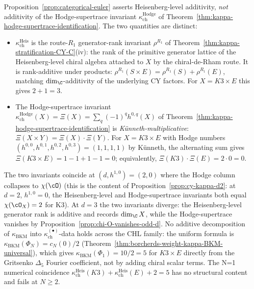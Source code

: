 \begin{remark}
\label{rem:categorical-euler-scope}
Proposition~\ref{prop:categorical-euler} asserts Heisenberg-level additivity, \emph{not} additivity of the Hodge-supertrace invariant $\kappa_{\mathrm{ch}}^{\mathrm{Hodge}}$ of Theorem~\ref{thm:kappa-hodge-supertrace-identification}. The two quantities are distinct:
\begin{itemize}
 \item $\kappa_{\mathrm{ch}}^{\mathrm{Heis}}$ is the route-$R_1$ generator-rank invariant $\rho^{R_1}$ of Theorem~\ref{thm:kappa-stratification-CY-C}(iv): the rank of the primitive generator lattice of the Heisenberg-level chiral algebra attached to $X$ by the chiral-de-Rham route. It is rank-additive under products: $\rho^{R_1}(S \times E) = \rho^{R_1}(S) + \rho^{R_1}(E)$, matching $\dim_\C$-additivity of the underlying CY factors. For $X = K3 \times E$ this gives $2 + 1 = 3$.
 \item The Hodge-supertrace invariant $\kappa_{\mathrm{ch}}^{\mathrm{Hodge}}(X) = \Xi(X) = \sum_q (-1)^q h^{0,q}(X)$ of Theorem~\ref{thm:kappa-hodge-supertrace-identification} is \emph{K\"unneth-multiplicative}: $\Xi(X \times Y) = \Xi(X) \cdot \Xi(Y)$. For $X = K3 \times E$ with Hodge numbers $(h^{0,0}, h^{0,1}, h^{0,2}, h^{0,3}) = (1, 1, 1, 1)$ by K\"unneth, the alternating sum gives $\Xi(K3 \times E) = 1 - 1 + 1 - 1 = 0$; equivalently, $\Xi(K3) \cdot \Xi(E) = 2 \cdot 0 = 0$.
\end{itemize}
The two invariants coincide at $(d, h^{1,0}) = (2, 0)$ where the Hodge column collapses to $\chi(\cO)$ (this is the content of Proposition~\ref{prop:cy-kappa-d2}: at $d = 2$, $h^{1,0} = 0$, the Heisenberg-level and Hodge-supertrace invariants both equal $\chi(\cO_X) = 2$ for K3). At $d = 3$ the two invariants diverge: the Heisenberg-level generator rank is additive and records $\dim_\C X$, while the Hodge-supertrace vanishes by Proposition~\ref{prop:chi-O-vanishes-odd-d}. No additive decomposition of $\kappa_{\mathrm{BKM}}$ into $\kappa_{\mathrm{ch}}^{(\bullet)}$-data holds across the CHL family: the uniform formula is $\kappa_{\mathrm{BKM}}(\Phi_N) = c_N(0)/2$ (Theorem~\ref{thm:borcherds-weight-kappa-BKM-universal}), which gives $\kappa_{\mathrm{BKM}}(\Phi_1) = 10/2 = 5$ for $K3 \times E$ directly from the Gritsenko $\Delta_5$ Fourier coefficient, not by adding chiral scalar terms. The N=1 numerical coincidence $\kappa_{\mathrm{ch}}^{\mathrm{Heis}}(K3) + \kappa_{\mathrm{ch}}^{\mathrm{Heis}}(E) + 2 = 5$ has no structural content and fails at $N \geq 2$.
\end{remark}


